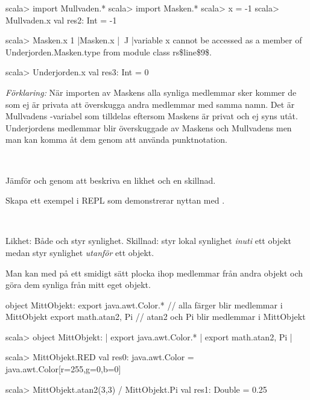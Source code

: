 \SubtaskSolved

\begin{REPL}
scala> import Mullvaden.*
scala> import Masken.*
scala> x = -1
scala> Mullvaden.x
val res2: Int = -1

scala> Masken.x
1 |Masken.x
  |^^^^^^^^
  |variable x cannot be accessed as a member of Underjorden.Masken.type from module class rs\$line\$9\$.

scala> Underjorden.x
val res3: Int = 0
\end{REPL}

\noindent \emph{Förklaring:} När importen av Maskens alla synliga medlemmar sker kommer de som ej är privata att överskugga andra medlemmar med samma namn. Det är Mullvadens -variabel som tilldelas  eftersom Maskens  är privat och ej syns utåt. Underjordens medlemmar blir överskuggade av Maskens  och Mullvadens  men man kan komma åt dem genom att använda punktnotation.

\QUESTEND




\QUESTBEGIN

\Task \what~

\Subtask Jämför  och  genom att beskriva en likhet och en skillnad. 

\Subtask Skapa ett exempel i REPL som demonstrerar nyttan med .

\SOLUTION

\TaskSolved \what~

\SubtaskSolved Likhet: Både  och  styr synlighet. Skillnad:  styr lokal synlighet \emph{inuti} ett objekt medan  styr synlighet \emph{utanför} ett objekt. 

\SubtaskSolved Man kan med  på ett smidigt sätt plocka ihop medlemmar från andra objekt och göra dem synliga från mitt eget objekt.
\begin{CodeSmall}
object MittObjekt:
  export java.awt.Color.*  // alla färger blir medlemmar i MittObjekt
  export math.{atan2, Pi}  // atan2 och Pi blir medlemmar i MittObjekt
\end{CodeSmall}

\begin{REPLsmall}
scala> object MittObjekt:
     |   export java.awt.Color.*
     |   export math.{atan2, Pi}  
     | 

scala> MittObjekt.RED
val res0: java.awt.Color = java.awt.Color[r=255,g=0,b=0]

scala> MittObjekt.atan2(3,3) / MittObjekt.Pi
val res1: Double = 0.25
\end{REPLsmall}

